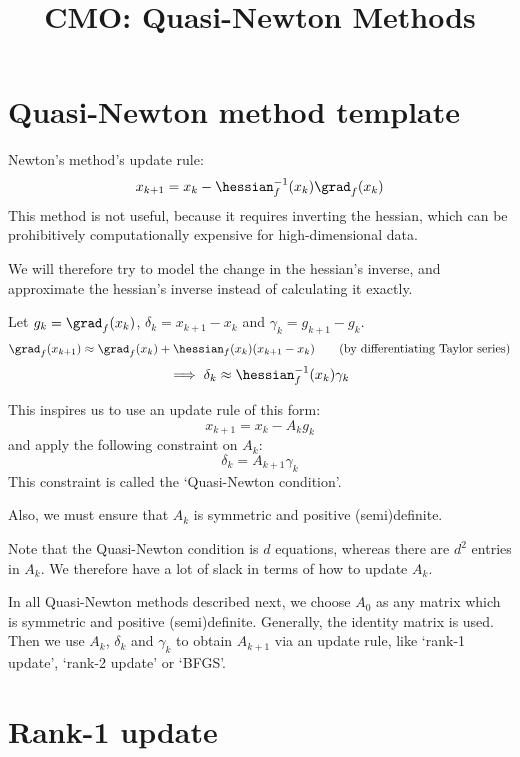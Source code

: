 


\title{CMO: Quasi-Newton Methods}



\maketitle
\initMinimal{}

\tableofcontents

\section{Quasi-Newton method template}

Newton's method's update rule:
\[ x_{k+1} = x_k - \hessian_f^{-1}(x_k)\grad_f(x_k) \]
This method is not useful, because it requires inverting the hessian,
which can be prohibitively computationally expensive for high-dimensional data.

We will therefore try to model the change in the hessian's inverse,
and approximate the hessian's inverse instead of calculating it exactly.

Let $g_k = \grad_f(x_k)$, $\delta_k = x_{k+1} - x_k$ and $\gamma_k = g_{k+1} - g_k$.
\[ \grad_f(x_{k+1}) \approx \grad_f(x_k) + \hessian_f(x_k)(x_{k+1} - x_k)
\tag{by differentiating Taylor series} \]
\[ \implies \delta_k \approx \hessian_f^{-1}(x_k)\gamma_k \]

This inspires us to use an update rule of this form:
\[ x_{k+1} = x_k - A_kg_k \]
and apply the following constraint on $A_k$:
\begin{equation} \label{eqn:qn-cond} \delta_k = A_{k+1}\gamma_k \end{equation}
This constraint is called the `Quasi-Newton condition'.

Also, we must ensure that $A_k$ is symmetric and positive (semi)definite.

Note that the Quasi-Newton condition is $d$ equations,
whereas there are $d^2$ entries in $A_k$.
We therefore have a lot of slack in terms of how to update $A_k$.

In all Quasi-Newton methods described next, we choose $A_0$
as any matrix which is symmetric and positive (semi)definite.
Generally, the identity matrix is used.
Then we use $A_k$, $\delta_k$ and $\gamma_k$ to obtain $A_{k+1}$ via an update rule,
like `rank-1 update', `rank-2 update' or `BFGS'.

\section{Rank-1 update}

